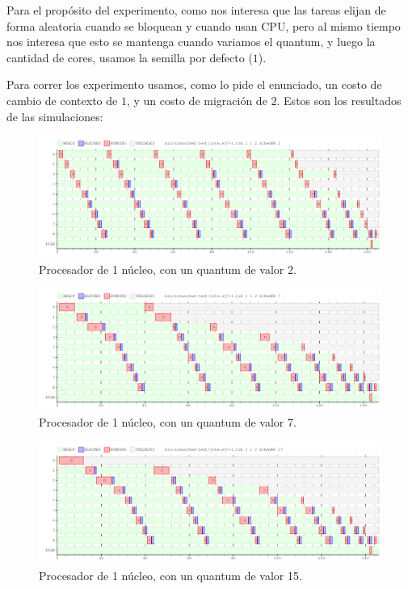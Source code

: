 \documentclass[a4paper]{article}
\begin{document}
Para el propósito del experimento, como nos interesa que las tareas elijan
de forma aleatoria cuando se bloquean y cuando usan CPU, pero al mismo
tiempo nos interesa que esto se mantenga cuando variamos el quantum, y luego
la cantidad de cores, usamos la semilla por defecto ($1$).

Para correr los experimento usamos, como lo pide el enunciado, un costo de
cambio de contexto de $1$, y un costo de migración de $2$.
Estos son los resultados de las simulaciones:

\begin{figure}[H]
\begin{center}
\includegraphics[scale=0.4]{imagenes/ej7-1-c-1-q-2.png}
\end{center}
\caption{Procesador de 1 núcleo, con un quantum de valor 2.}
\end{figure}

\begin{figure}[H]
\begin{center}
\includegraphics[scale=0.4]{imagenes/ej7-1-c-1-q-7.png}
\end{center}
\caption{Procesador de 1 núcleo, con un quantum de valor 7.}
\end{figure}

\begin{figure}[H]
\begin{center}
\includegraphics[scale=0.4]{imagenes/ej7-1-c-1-q-15.png}
\end{center}
\caption{Procesador de 1 núcleo, con un quantum de valor 15.}
\end{figure}
\end{document}
